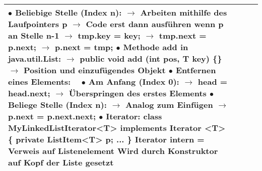 \documentclass[11pt,a4paper]{article}
\begin{document}
\begin{center}
\begin{longtable}[h]{ | p{2.3cm} | p{2.3cm} | p{12.6cm} | p{1.2cm} | }
{	\hspace{0.4cm} $\bullet$ Beliebige Stelle (Index n): \\
	\hspace{0.6cm} $\rightarrow$ Arbeiten mithilfe des Laufpointers p \\
	\hspace{0.6cm} $\rightarrow$ Code erst dann ausführen wenn p an Stelle n-1 \\
	\hspace{0.6cm} $\rightarrow$ tmp.key = key;\\
	\hspace{0.6cm} $\rightarrow$ tmp.next = p.next; \\
	\hspace{0.6cm} $\rightarrow$ p.next = tmp; \\
	$\bullet$ Methode add in java.util.List: \\
	\hspace{0.4cm} $\rightarrow$ public void add (int pos, T key) \{\} \\ 
	\hspace{0.4cm} $\rightarrow$ Position und einzufügendes Objekt \\
	$\bullet$ Entfernen eines Elements: \\ \
	\hspace{0.4cm} $\bullet$ Am Anfang (Index 0): \\
	\hspace{0.6cm} $\rightarrow$ head = head.next; \\
	\hspace{0.6cm} $\rightarrow$ Überspringen des erstes Elements\\
	\hspace{0.4cm} $\bullet$ Beliege Stelle (Index n): \\
	\hspace{0.6cm} $\rightarrow$ Analog zum Einfügen \\
	\hspace{0.6cm} $\rightarrow$ p.next = p.next.next; \\ 
	$\bullet$ Iterator: \\
	\hspace{0.4cm} class MyLinkedListIterator<T> implements Iterator <T> \{ \\ 
	\hspace{0.4cm} private ListItem<T> p; ... \} \\
	\hspace{0.4cm} Iterator intern = Verweis auf Listenelement \\
	\hspace{0.6cm} Wird durch Konstruktor auf Kopf der Liste gesetzt} \\
	\hline



\end{longtable}
\end{center}
\end{document}
